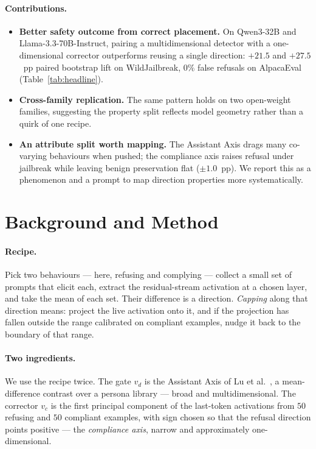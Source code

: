 \documentclass{article}
\begin{document}
\paragraph{Contributions.}
\begin{itemize}
\item \textbf{Better safety outcome from correct placement.} On
      Qwen3-32B and Llama-3.3-70B-Instruct, pairing a
      multidimensional detector with a one-dimensional corrector
      outperforms reusing a single direction: $+21.5$ and
      $+27.5$~pp paired bootstrap lift on WildJailbreak, $0\%$
      false refusals on AlpacaEval (Table~\ref{tab:headline}).
\item \textbf{Cross-family replication.} The same pattern holds
      on two open-weight families, suggesting the property split
      reflects model geometry rather than a quirk of one recipe.
\item \textbf{An attribute split worth mapping.} The Assistant
      Axis drags many co-varying behaviours when pushed; the
      compliance axis raises refusal under jailbreak while leaving
      benign preservation flat ($\pm 1.0$~pp). We report this as a
      phenomenon and a prompt to map direction properties more
      systematically.
\end{itemize}

\section{Background and Method}
\label{sec:method}

\paragraph{Recipe.} Pick two behaviours --- here, refusing and
complying --- collect a small set of prompts that elicit each,
extract the residual-stream activation at a chosen layer, and take
the mean of each set. Their difference is a direction.
\emph{Capping} along that direction means: project the live
activation onto it, and if the projection has fallen outside the range calibrated on
compliant examples, nudge it back to the boundary of that range.

\paragraph{Two ingredients.} We use the recipe twice. The gate
$v_d$ is the Assistant Axis of Lu et al.~\cite{lu2026assistant}, a
mean-difference contrast over a persona library --- broad and
multidimensional. The corrector $v_c$ is the first principal component of the
last-token activations from $50$ refusing and $50$ compliant
examples, with sign chosen so that the refusal direction points
positive --- the \emph{compliance axis}, narrow and approximately
one-dimensional.
\end{document}
